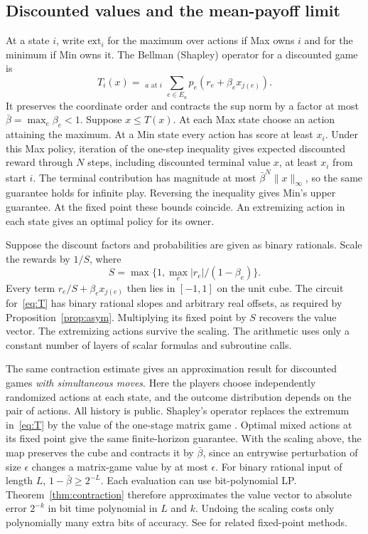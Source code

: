 \subsection{Discounted values and the mean-payoff limit}
\label{sec:shortslopes}

At a state \(i\), write \(\mathrm{ext}_i\) for the maximum over actions
if Max owns \(i\) and for the minimum if Min owns it. The Bellman
(Shapley) operator for a discounted game is
\begin{equation}\label{eq:T}
 T_i(x)=\mathop{\mathrm{ext}_i}_{a\text{ at }i}
        \sum_{e\in E_a}p_e(r_e+\beta_e x_{j(e)}).
\end{equation}
It preserves the coordinate order and contracts the sup norm by a
factor at most \(\bar\beta=\max_e\beta_e<1\). Suppose \(x\le T(x)\).
At each Max state choose an action attaining the maximum. At a Min
state every action has score at least \(x_i\). Under this Max policy,
iteration of the one-step inequality gives expected discounted reward
through \(N\) steps, including discounted terminal value \(x\), at
least \(x_i\) from start \(i\). The terminal contribution has magnitude
at most \(\bar\beta^N\|x\|_\infty\), so the same guarantee holds for
infinite play. Reversing the inequality gives Min's upper guarantee.
At the fixed point these bounds coincide. An extremizing action in
each state gives an optimal policy for its owner.

Suppose the discount factors and probabilities are given as binary
rationals. Scale the rewards by \(1/S\), where
\[
 S=\max\{1,\max_e |r_e|/(1-\beta_e)\}.
\]
Every term \(r_e/S+\beta_e x_{j(e)}\) then lies in \([-1,1]\) on the
unit cube. The circuit for~\eqref{eq:T} has binary rational slopes
and arbitrary real offsets, as required by Proposition~\ref{prop:asym}.
Multiplying its fixed point by \(S\) recovers the value vector.
The extremizing actions survive the scaling. The arithmetic uses
only a constant number of layers of scalar formulas and subroutine calls.

The same contraction estimate gives an approximation result for
discounted games \emph{with simultaneous moves}. Here the players
choose independently randomized actions at each state, and the
outcome distribution depends on the pair of actions. All history is
public. Shapley's operator replaces the extremum in~\eqref{eq:T} by
the value of the one-stage matrix game \cite{Shap}. Optimal mixed
actions at its fixed point give the same finite-horizon guarantee.
With the scaling above, the map preserves the cube and contracts it by
\(\bar\beta\), since an entrywise perturbation of size \(\epsilon\)
changes a matrix-game value by at most \(\epsilon\). For binary
rational input of length \(L\), \(1-\bar\beta\ge 2^{-L}\). Each
evaluation can use bit-polynomial LP. Theorem~\ref{thm:contraction}
therefore approximates the value vector to absolute error \(2^{-k}\)
in bit time polynomial in \(L\) and \(k\). Undoing the scaling costs
only polynomially many extra bits of accuracy. See
\cite{EPRY,BFGMS,FH} for related fixed-point methods.

